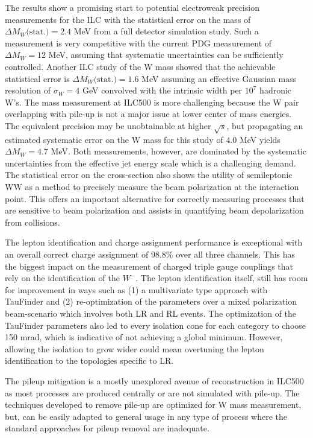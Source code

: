 The results show a promising start to potential electroweak precision measurements for the ILC with the statistical error on the mass of $\Delta M_W\text{(stat.)}= 2.4$ MeV from a full detector simulation study. Such a measurement is very competitive with the current PDG measurement of $\Delta M_W=12$ MeV, assuming that systematic uncertainties can be sufficiently controlled.  Another ILC study of the W mass showed that the achievable statistical error is $\Delta M_W\text{(stat.)} = 1.6$ MeV assuming an effective Gaussian mass resolution of $\sigma_W= 4$ GeV convolved with the intrinsic width per $10^7$ hadronic W's\cite{graham}. The mass measurement at ILC500 is more challenging because the W pair overlapping with pile-up is not a major issue at lower center of mass energies. The equivalent precision may be unobtainable at higher $\sqrt{s}$, but propagating an estimated systematic error on the W mass for this study of $4.0$ MeV yields $\Delta M_W = 4.7$ MeV. Both measurements, however, are dominated by the systematic uncertainties from the effective jet energy scale which is a challenging demand.  The statistical error on the cross-section also shows the utility of semileptonic WW as a method to precisely measure the beam polarization at the interaction point. This offers an important alternative for  correctly measuring processes that are sensitive to beam polarization and assists in quantifying beam depolarization from collisions.

The lepton identification and charge assignment performance is exceptional with an overall correct charge assignment of $98.8\%$ over all three channels. This has the biggest impact on the measurement of charged triple gauge couplings that rely on the identification of the $W^-$. The lepton identification itself, still has room for improvement in ways such as (1) a multivariate type approach with TauFinder and (2) re-optimization of the parameters over a mixed polarization beam-scenario which involves both LR and RL events.  The optimization of the TauFinder parameters also led to every isolation cone for each category to choose 150 mrad, which is indicative of not achieving a global minimum. However, allowing the isolation to grow wider could mean overtuning the lepton identification to the topologies specific to LR. 

The pileup mitigation is a mostly unexplored avenue of reconstruction in ILC500 as most processes are produced centrally or are not simulated with pile-up. The techniques developed to remove pile-up are optimized for W mass measurement, but, can be easily adapted to general usage in any type of process where the standard approaches for pileup removal are inadequate. 

